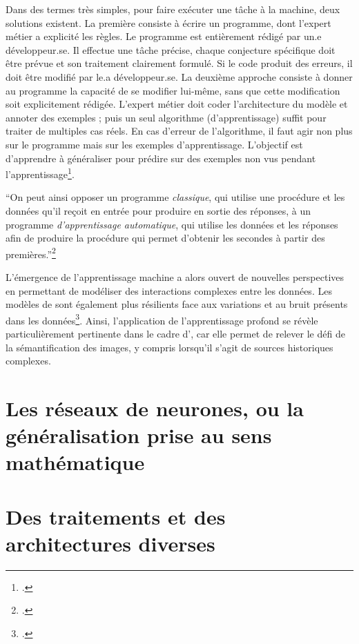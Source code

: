 Dans des termes très simples, pour faire exécuter une tâche à la
machine, deux solutions existent. La première consiste à écrire un
programme, dont l'expert métier a explicité les règles. Le programme est
entièrement rédigé par un.e développeur.se. Il effectue une tâche précise,
chaque conjecture spécifique doit être prévue et son traitement
clairement formulé. Si le code produit des erreurs, il doit être modifié
par le.a développeur.se. La deuxième approche consiste à donner au programme
la capacité de se modifier lui-même, sans que cette modification soit
explicitement rédigée. L'expert métier doit coder l'architecture du modèle et
annoter des exemples ; puis un seul algorithme (d'apprentissage) suffit pour
traiter de multiples cas réels. En cas d'erreur de l'algorithme, il faut agir non plus
sur le programme mais sur les exemples d'apprentissage. L'objectif est
d'apprendre à généraliser pour prédire sur des exemples non vus pendant
l'apprentissage\footcite[p.7]{chollet_apprentissage_2020}.

\begin{kwote}         
``On peut ainsi opposer un programme \emph{classique}, qui utilise une
procédure et les données qu'il reçoit en entrée pour produire en sortie
des réponses, à un programme \emph{d'apprentissage automatique}, qui
utilise les données et les réponses afin de produire la procédure qui
permet d'obtenir les secondes à partir des premières.''\footcite[p.1-2]{azencott_introduction_2022}
\end{kwote} 

L'émergence de l'apprentissage machine a alors ouvert de nouvelles
perspectives en permettant de modéliser des interactions complexes entre
les données. Les modèles de \dl sont également plus
résilients face aux variations et au bruit présents dans les
données\footcite{juneja_deep_2023}. Ainsi,
l'application de l'apprentissage profond se révèle particulièrement
pertinente dans le cadre d'\eida, car elle permet de relever le défi
de la sémantification des images, y compris lorsqu'il s'agit de sources
historiques complexes.

        \hypertarget{les-reseaux-de-neurone}{%
        \section{Les réseaux de neurones, ou la généralisation prise au sens
        mathématique}\label{les-reseaux-de-neurone}}
         


        \hypertarget{des-traitements-et-des-architectures-diverses}{%
        \section{Des traitements et des architectures
        diverses}\label{des-traitements-et-des-architectures-diverses}}
         

